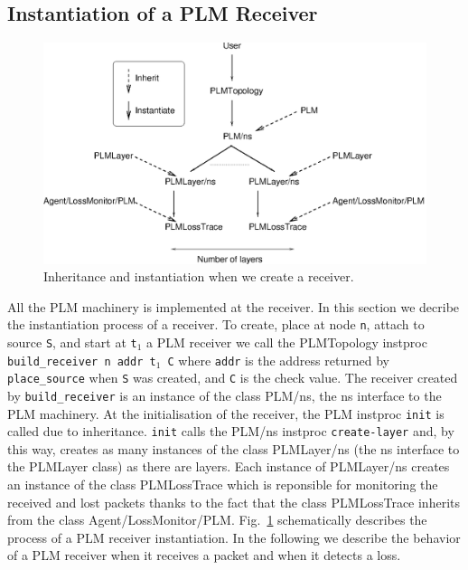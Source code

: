 {\subsection{Instantiation of a PLM Receiver}

\begin{figure}[tbp]
  \centerline{\includegraphics{instanPLMrecv.eps}}
  \caption{Inheritance and instantiation when we create a receiver.}
  \label{fig:instanPLMrecv}
\end{figure}

All the PLM machinery is implemented at the receiver. In this section we decribe
the instantiation process of a receiver. To create, place at node
{\tt n},  attach to source {\tt S}, and start at {\tt t$_1$} a PLM receiver we
call the PLMTopology instproc {\tt 
  build\_receiver n addr t$_1$ C} where {\tt addr} is the address returned
by {\tt place\_source} when {\tt S} was created, and {\tt C} is the check value. The
receiver created by {\tt build\_receiver} is an instance of the class PLM/ns,
the ns interface to the PLM 
machinery. At the initialisation of the receiver, the PLM instproc {\tt init} is
called due to inheritance. {\tt init} calls the PLM/ns instproc
{\tt create-layer} and, by this way,  creates as many instances of the class 
PLMLayer/ns (the ns interface to the PLMLayer class) as there are layers. Each
instance of PLMLayer/ns creates an instance of the class PLMLossTrace which is
reponsible for 
monitoring the received and lost packets thanks to the fact that the class
PLMLossTrace inherits from the class Agent/LossMonitor/PLM. 
Fig.~\ref{fig:instanPLMrecv} schematically describes the process  of a PLM
receiver instantiation. In the following we describe the behavior of a PLM
receiver when it receives a packet and when it detects a loss.



}
